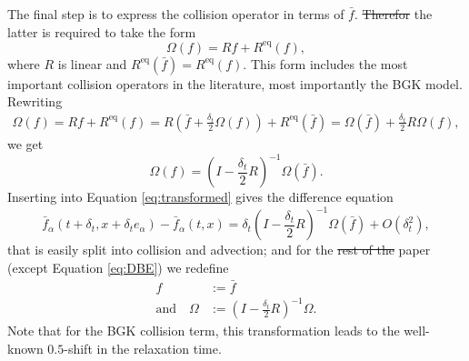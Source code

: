\documentclass[1p, sort&compress]{elsarticle}
\providecommand{\DIFaddtex}[1]{{\protect\color{blue}\uwave{#1}}} %
\providecommand{\DIFdeltex}[1]{{\protect\color{red}\sout{#1}}}                      %
\providecommand{\DIFaddbegin}{} %
\providecommand{\DIFaddend}{} %
\providecommand{\DIFdelbegin}{} %
\providecommand{\DIFdelend}{} %
\providecommand{\DIFadd}[1]{\texorpdfstring{\DIFaddtex{#1}}{#1}} %
\providecommand{\DIFdel}[1]{\texorpdfstring{\DIFdeltex{#1}}{}} %
\newcommand{\DIFscaledelfig}{0.5}
\newlength{\DIFdelgraphicswidth} %
\newlength{\DIFdelgraphicsheight} %
\newcommand{\DIFaddincludegraphics}[2][]{{\color{blue}\fbox{\DIFOincludegraphics[#1]{#2}}}} %
\newcommand{\DIFdelincludegraphics}[2][]{%
\sbox{\DIFdelgraphicsbox}{\DIFOincludegraphics[#1]{#2}}%
\settoboxwidth{\DIFdelgraphicswidth}{\DIFdelgraphicsbox} %
\settoboxtotalheight{\DIFdelgraphicsheight}{\DIFdelgraphicsbox} %
\scalebox{\DIFscaledelfig}{%
\parbox[b]{\DIFdelgraphicswidth}{\usebox{\DIFdelgraphicsbox}\\[-\baselineskip] \rule{\DIFdelgraphicswidth}{0em}}\llap{\resizebox{\DIFdelgraphicswidth}{\DIFdelgraphicsheight}{%
\setlength{\unitlength}{\DIFdelgraphicswidth}%
\begin{picture}(1,1)%
\thicklines\linethickness{2pt} %
{\color[rgb]{1,0,0}\put(0,0){\framebox(1,1){}}}%
{\color[rgb]{1,0,0}\put(0,0){\line( 1,1){1}}}%
{\color[rgb]{1,0,0}\put(0,1){\line(1,-1){1}}}%
\end{picture}%
}\hspace*{3pt}}} %
} %
\DeclareRobustCommand{\DIFaddbegin}{\DIFOaddbegin \let\includegraphics\DIFaddincludegraphics} %
\DeclareRobustCommand{\DIFaddend}{\DIFOaddend \let\includegraphics\DIFOincludegraphics} %
\DeclareRobustCommand{\DIFdelbegin}{\DIFOdelbegin \let\includegraphics\DIFdelincludegraphics} %
\DeclareRobustCommand{\DIFdelend}{\DIFOaddend \let\includegraphics\DIFOincludegraphics} %
\begin{document}
The final step is to express the collision operator in terms of $\bar{f}$. \DIFdelbegin \DIFdel{Therefor }\DIFdelend \DIFaddbegin \DIFadd{Therefore }\DIFaddend the latter is required to take the form
\begin{equation*}
	\Omega(f) = Rf + R^{\mathrm{eq}} (f),
\end{equation*}
where $R$ is linear and $R^{\mathrm{eq}}(\bar{f}) = R^{\mathrm{eq}}(f).$
This form includes the most important collision operators in the literature, most importantly the BGK model.
Rewriting 
\begin{align*}
	\Omega (f) 	= Rf + R^{\mathrm{eq}} (f) 
				= R \left( \bar{f} + \frac{\delta_t}{2}\Omega(f) \right) + R^{\mathrm{eq}} (\bar{f})
				= \Omega (\bar{f}) +  \frac{\delta_t}{2} R \Omega(f),
\end{align*}
we get
\begin{equation*}
	\Omega(f) = \left( I - \frac{\delta_t}{2} R \right)^{-1} \Omega(\bar{f}).
\end{equation*}
Inserting into Equation \eqref{eq:transformed} gives the difference equation
\begin{equation*}
	\bar{f}_{\alpha} (t+\delta_t, x+\delta_t e_{\alpha}) - \bar{f}_{\alpha}(t,x)
		= \delta_t \left( I-\frac{\delta_t}{2} R \right)^{-1} \Omega(\bar{f}) 
			+ O \left( \delta_{t}^{2} \right),
\end{equation*}
that is easily split into collision and advection;
and for the \DIFdelbegin \DIFdel{rest of the }\DIFdelend \DIFaddbegin \DIFadd{whole }\DIFaddend paper (except Equation \eqref{eq:DBE}) we redefine
\begin{align*}
	f &:= \bar{f}\\
	\mathrm{and} \quad
	\Omega &:= \left( I - \frac{\delta_t}{2} R \right)^{-1} \Omega.
\end{align*}
Note that for the BGK collision term, this transformation leads to the well-known $0.5$-shift in the relaxation time.
\DIFaddbegin 
\end{document}
